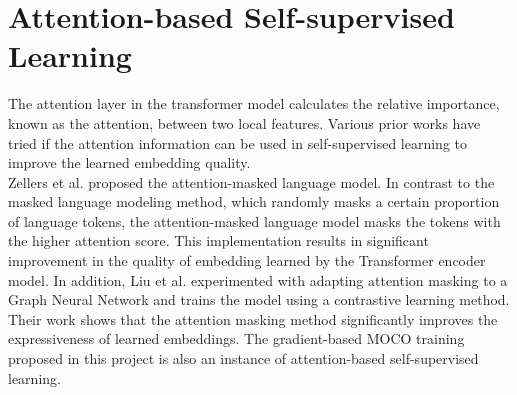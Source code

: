 \documentclass[12pt,twoside]{report}
\begin{document}
\section{Attention-based Self-supervised Learning} \label{sec:prior_attention_self-supervise}

The attention layer in the transformer model calculates the relative importance, known as the attention, between two local features. Various prior works have tried if the attention information can be used in self-supervised learning to improve the learned embedding quality. \\

Zellers et al. \cite{merlot} proposed the attention-masked language model. In contrast to the masked language modeling method, which randomly masks a certain proportion of language tokens, the attention-masked language model masks the tokens with the higher attention score. This implementation results in significant improvement in the quality of embedding learned by the Transformer encoder model. In addition, Liu et al. \cite{graphAttMask} experimented with adapting attention masking to a Graph Neural Network and trains the model using a contrastive learning method. Their work shows that the attention masking method significantly improves the expressiveness of learned embeddings. The gradient-based MOCO training proposed in this project is also an instance of attention-based self-supervised learning. 

\end{document}

